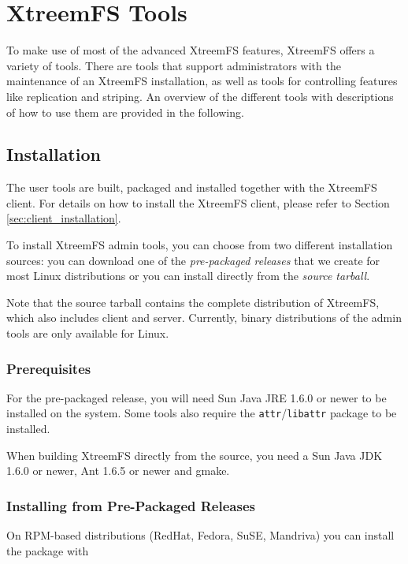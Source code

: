 \documentclass[a4paper,10pt]{book}
\begin{document}
\chapter{XtreemFS Tools}

To make use of most of the advanced XtreemFS features, XtreemFS offers a variety of tools. There are tools that support administrators with the maintenance of an XtreemFS installation, as well as tools for controlling features like replication and striping. An overview of the different tools with descriptions of how to use them are provided in the following.

\section{Installation}

The user tools are built, packaged and installed together with the XtreemFS client. For details on how to install the XtreemFS client, please refer to Section \ref{sec:client_installation}.

To install XtreemFS admin tools, you can choose from two different installation sources: you can download one of the \emph{pre-packaged releases} that we create for most Linux distributions or you can install directly from the \emph{source tarball}.

Note that the source tarball contains the complete distribution of XtreemFS, which also includes client and server. Currently, binary distributions of the admin tools are only available for Linux.

\subsection{Prerequisites}

For the pre-packaged release, you will need Sun Java JRE 1.6.0 or newer to be installed on the system. Some tools also require the \texttt{attr}/\texttt{libattr} package to be installed.

When building XtreemFS directly from the source, you need a Sun Java JDK 1.6.0 or newer, Ant 1.6.5 or newer and gmake.

\subsection{Installing from Pre-Packaged Releases}

On RPM-based distributions (RedHat, Fedora, SuSE, Mandriva) you can install the package with
\end{document}
